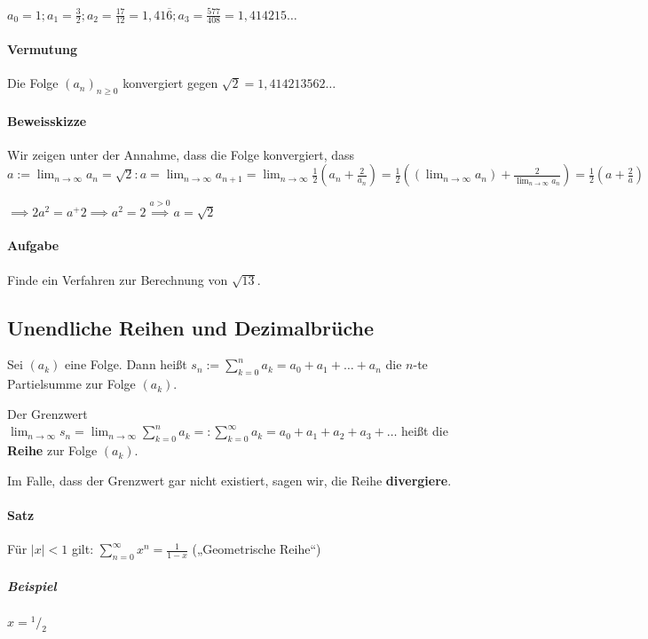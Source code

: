 \documentclass[14pt,a4paper]{article}
\newcommand*\rfrac[2]{{}^{#1}\!/_{#2}}
\begin{document}
  $a_0 = 1 ; a_1 = \frac{3}{2} ; a_2 = \frac{17}{12} = 1,41\overline{6} ; a_3 = \frac{577}{408} = 1,414215\ldots $

  \paragraph{Vermutung}
  Die Folge $ (a_n)_{n \geq 0}$ konvergiert gegen $\sqrt{2} = 1,414213562\ldots $

  \paragraph{Beweisskizze}
  Wir zeigen unter der Annahme, dass die Folge konvergiert, dass \\
  $ a := \lim_{n\to \infty} a_n = \sqrt{2} : a = \lim_{n \to \infty} a_{n+1} =
  \lim_{n \to \infty} \frac{1}{2}(a_n + \frac{2}{a_n}) = \frac{1}{2} (( \lim_{n
    \to \infty} a_n) + \frac{2}{\lim_{n \to \infty} a_n}) = \frac{1}{2} ( a +
  \frac{2}{a}) $

  $\implies 2 a^2 = a^+ 2 \implies a^2 = 2 \stackrel{a > 0}{\implies} a =
  \sqrt{2}$

  \paragraph{Aufgabe}
  Finde ein Verfahren zur Berechnung von $\sqrt{13}$.

  \subsection{Unendliche Reihen und Dezimalbrüche}
  Sei $(a_k)$ eine Folge. Dann heißt $s_n := \sum_{k=0}^n a_k = a_0 + a_1 +
  \ldots + a_n$ die $n$-te Partielsumme zur Folge $(a_k)$.

  Der Grenzwert $\lim_{n \to \infty} s_n = \lim_{n \to \infty} \sum_{k=0}^n a_k
  =: \sum_{k=0}^\infty a_k = a_0 + a_1 + a_2 + a_3 + \ldots $ heißt die
  \textbf{Reihe} zur Folge $(a_k)$.

  Im Falle, dass der Grenzwert gar nicht existiert, sagen wir, die Reihe \textbf{divergiere}.

  \paragraph{Satz}
  Für $|x| < 1$ gilt: $ \sum_{n=0}^\infty x^n = \frac{1}{1-x}$ („Geometrische Reihe“)

  \subparagraph{Beispiel}
  $x = \rfrac{1}{2}$
\end{document}
